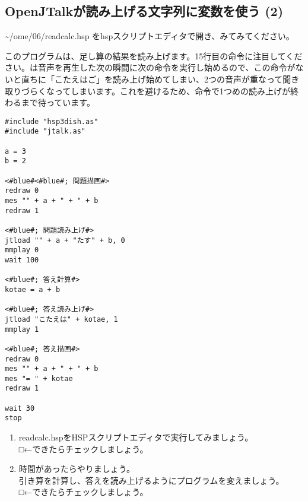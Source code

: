\subsection{OpenJTalkが読み上げる文字列に変数を使う (2)}
 \textasciitilde /ome/06/readcalc.hsp をhspスクリプトエディタで開き、みてみてください。

このプログラムは、足し算の結果を読み上げます。15行目の命令に注目してください。は音声を再生した次の瞬間に次の命令を実行し始めるので、この命令がないと直ちに「こたえはご」を読み上げ始めてしまい、2つの音声が重なって聞き取りづらくなってしまいます。これを避けるため、命令で1つめの読み上げが終わるまで待っています。\\

\begin{lstlisting}[caption=readcalc.hsp,label=readcalc.hsp]
#include "hsp3dish.as"
#include "jtalk.as"

a = 3
b = 2

<#blue#<#blue#; 問題描画#>
redraw 0
mes "" + a + " + " + b
redraw 1

<#blue#; 問題読み上げ#>
jtload "" + a + "たす" + b, 0
mmplay 0
wait 100

<#blue#; 答え計算#>
kotae = a + b

<#blue#; 答え読み上げ#>
jtload "こたえは" + kotae, 1
mmplay 1

<#blue#; 答え描画#>
redraw 0
mes "" + a + " + " + b
mes "= " + kotae
redraw 1

wait 30
stop
\end{lstlisting}

\begin{tcolorbox}[title=\useOmetoi]
\begin{enumerate}
\item readcalc.hspをHSPスクリプトエディタで実行してみましょう。\\□←できたらチェックしましょう。
\item 時間があったらやりましょう。\\引き算を計算し、答えを読み上げるようにプログラムを変えましょう。\\□←できたらチェックしましょう。
\end{enumerate}
\end{tcolorbox}
